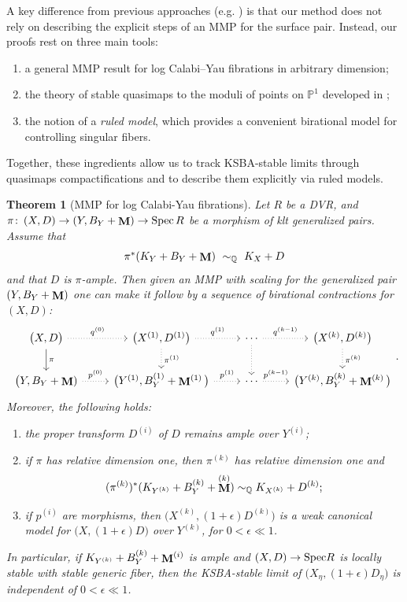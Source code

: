\documentclass[a4paper,12pt]{amsart}
\DeclareMathOperator{\Spec}{Spec}
\newcommand{\bQ}{{\mathbb Q}}
\DeclareMathOperator{\bfM}{{\bf{M}}}
\newcommand\spec{\text{\rm Spec}}
\newtheorem{theorem}{Theorem}[section]
\theoremstyle{definition}
\theoremstyle{remark}
\begin{document}
\medskip
A key difference from previous approaches (e.g. \cite{DH,ascher_invariance_pluri,alexeev2023explicit}) is that our method does not rely on describing the explicit steps of an MMP for the surface pair. Instead, our proofs rest on three main tools:
\begin{enumerate}
    \item a general MMP result for log Calabi–Yau fibrations in arbitrary dimension;
    \item the theory of stable quasimaps to the moduli of points on $\mathbb{P}^1$ developed in \cite{twisted_map_2};
    \item the notion of a \emph{ruled model}, which provides a convenient birational model for controlling singular fibers.
\end{enumerate}
Together, these ingredients allow us to track KSBA-stable limits through quasimaps compactifications and to describe them explicitly via ruled models.

\begin{theorem}[MMP for log Calabi-Yau fibrations]\label{thm_intrp_MMP} Let $R$ be a DVR, and $\pi\colon \left(X,D\right)\to (Y,B_Y+\bfM)\rightarrow \Spec R$ be a morphism of klt generalized pairs. Assume that $$\textstyle \pi^*(K_Y+B_Y+\bfM) \ \sim_\bQ \ K_X +D$$ and that $D$ is $\pi$-ample. Then given an MMP with scaling for the generalized pair $(Y,B_Y+\bfM)$ one can make it follow by a sequence of birational contractions
    for $(X,D)$: 
    $$\begin{tikzcd}
	{\big(X,D\big)} & {\big(X^{(1)},D^{(1)}\big)} & \cdots & {\big(X^{(k)},D^{(k)}\big)} \\
	{\big(Y,B_Y+\bfM)} & {\big(Y^{(1)},B_Y^{(1)}+\bfM^{(1)}\big)} & \cdots & {\big(Y^{(k)},B_Y^{(k)}+\bfM^{(k)}\big)}
	\arrow["{q^{(0)}}", dotted, from=1-1, to=1-2]
	\arrow["{\pi}", from=1-1, to=2-1]
	\arrow["{q^{(1)}}", dotted, from=1-2, to=1-3]
	\arrow["{\pi^{(1)}}", dotted, from=1-2, to=2-2]
	\arrow["{q^{(k-1)}}", dotted, from=1-3, to=1-4]
	\arrow[dotted, from=1-3, to=2-3]
	\arrow["{\pi^{(k)}}", dotted, from=1-4, to=2-4]
	\arrow["{p^{(0)}}", dotted,from=2-1, to=2-2]
	\arrow["{p^{(1)}}", dotted,from=2-2, to=2-3]
	\arrow["{p^{(k-1)}}", dotted,from=2-3, to=2-4]
\end{tikzcd}.$$ Moreover, the following holds:
\begin{enumerate}
    \item the proper transform $D^{(i)}$ of $D$
    remains ample over $Y^{(i)}$;
    \item if $\pi$ has relative dimension one, then $\pi^{(k)}$ has relative dimension one and \[(\pi^{(k)})^*(K_{Y^{(k)}}+B_Y^{(k)}+\bfM^{(k)})\sim_\bQ K_{X^{(k)}} +D^{(k)};\]
    \item if $p^{(i)}$ are morphisms, then $\big(X^{(k)},(1+\epsilon)D^{(k)}\big)$ is a weak canonical model for $\big(X,(1+\epsilon)D\big)$ over $Y^{(k)}$, for $0<\epsilon \ll 1$. 
\end{enumerate}
In particular, if $K_{Y^{(k)}} +  B_Y^{(k)}+\bfM^{(i)}$ is ample and $(X,D)\to \spec R$ is locally stable with stable generic fiber, then the KSBA-stable limit of $\big(X_\eta,(1 +\epsilon)D_\eta\big)$ is independent of $0<\epsilon\ll 1$.
\end{theorem}
\end{document}
